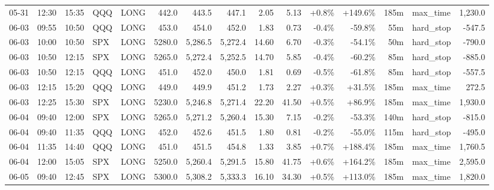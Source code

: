 \documentclass[11pt,a4paper,twoside]{article}
\begin{document}
\begin{landscape}
\begin{center}
\begin{longtable}{>{\color{txtmain}}l l l l l r r r r r r r r >{\color{txtmain}}l r}
05-31 & 12:30 & 15:35 & QQQ & LONG & 442.0 & 443.5 & 447.1 & 2.05 & 5.13 & \textcolor{wingreen}{+0.8\%} & \textcolor{wingreen}{+149.6\%} & 185m & max\_time & \textcolor{wingreen}{1,230.0} \\
06-03 & 09:55 & 10:50 & QQQ & LONG & 453.0 & 454.0 & 452.0 & 1.83 & 0.73 & \textcolor{lossred}{-0.4\%} & \textcolor{lossred}{-59.8\%} & 55m & hard\_stop & \textcolor{lossred}{-547.5} \\
06-03 & 10:00 & 10:50 & SPX & LONG & 5280.0 & 5,286.5 & 5,272.4 & 14.60 & 6.70 & \textcolor{lossred}{-0.3\%} & \textcolor{lossred}{-54.1\%} & 50m & hard\_stop & \textcolor{lossred}{-790.0} \\
06-03 & 10:50 & 12:15 & SPX & LONG & 5265.0 & 5,272.4 & 5,252.5 & 14.70 & 5.85 & \textcolor{lossred}{-0.4\%} & \textcolor{lossred}{-60.2\%} & 85m & hard\_stop & \textcolor{lossred}{-885.0} \\
06-03 & 10:50 & 12:15 & QQQ & LONG & 451.0 & 452.0 & 450.0 & 1.81 & 0.69 & \textcolor{lossred}{-0.5\%} & \textcolor{lossred}{-61.8\%} & 85m & hard\_stop & \textcolor{lossred}{-557.5} \\
06-03 & 12:15 & 15:20 & QQQ & LONG & 449.0 & 449.9 & 451.2 & 1.73 & 2.27 & \textcolor{wingreen}{+0.3\%} & \textcolor{wingreen}{+31.5\%} & 185m & max\_time & \textcolor{wingreen}{272.5} \\
06-03 & 12:25 & 15:30 & SPX & LONG & 5230.0 & 5,246.8 & 5,271.4 & 22.20 & 41.50 & \textcolor{wingreen}{+0.5\%} & \textcolor{wingreen}{+86.9\%} & 185m & max\_time & \textcolor{wingreen}{1,930.0} \\
06-04 & 09:40 & 12:00 & SPX & LONG & 5265.0 & 5,271.2 & 5,260.4 & 15.30 & 7.15 & \textcolor{lossred}{-0.2\%} & \textcolor{lossred}{-53.3\%} & 140m & hard\_stop & \textcolor{lossred}{-815.0} \\
06-04 & 09:40 & 11:35 & QQQ & LONG & 452.0 & 452.6 & 451.5 & 1.80 & 0.81 & \textcolor{lossred}{-0.2\%} & \textcolor{lossred}{-55.0\%} & 115m & hard\_stop & \textcolor{lossred}{-495.0} \\
06-04 & 11:35 & 14:40 & QQQ & LONG & 451.0 & 451.5 & 454.8 & 1.33 & 3.85 & \textcolor{wingreen}{+0.7\%} & \textcolor{wingreen}{+188.4\%} & 185m & max\_time & \textcolor{wingreen}{1,760.5} \\
06-04 & 12:00 & 15:05 & SPX & LONG & 5250.0 & 5,260.4 & 5,291.5 & 15.80 & 41.75 & \textcolor{wingreen}{+0.6\%} & \textcolor{wingreen}{+164.2\%} & 185m & max\_time & \textcolor{wingreen}{2,595.0} \\
06-05 & 09:40 & 12:45 & SPX & LONG & 5300.0 & 5,308.2 & 5,333.3 & 16.10 & 34.30 & \textcolor{wingreen}{+0.5\%} & \textcolor{wingreen}{+113.0\%} & 185m & max\_time & \textcolor{wingreen}{1,820.0} \\

\end{longtable}
\end{center}
\end{landscape}
\end{document}
